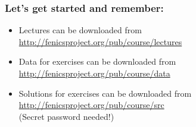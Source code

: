 \documentclass{fenicscourse}
\begin{document}
\begin{frame}
\frametitle{Let's get started and remember:}

\bigskip
\begin{itemize}
\item
{\footnotesize Lectures can be downloaded from
  \url{http://fenicsproject.org/pub/course/lectures}}

\item
{\footnotesize Data for exercises can be downloaded from
  \url{http://fenicsproject.org/pub/course/data}}

\item
{\footnotesize Solutions for exercises can be downloaded from
  \url{http://fenicsproject.org/pub/course/src} \\
(Secret password needed!)
}
\end{itemize}
\end{frame}
\end{document}
